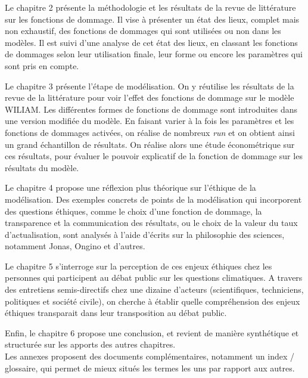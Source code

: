 Le chapitre 2 présente la méthodologie et les résultats de la revue de littérature sur les fonctions de dommage. Il vise à présenter un état des lieux, complet mais non exhaustif, des fonctions de dommages qui sont utilisées ou non dans les modèles. Il est suivi d'une analyse de cet état des lieux, en classant les fonctions de dommages selon leur utilisation finale, leur forme ou encore les paramètres qui sont pris en compte. 

Le chapitre 3 présente l'étape de modélisation. On y réutilise les résultats de la revue de la littérature pour voir l'effet des fonctions de dommage sur le modèle WILIAM. Les différentes formes de fonctions de dommage sont introduites dans une version modifiée du modèle. En faisant varier à la fois les paramètres et les fonctions de dommages activées, on réalise de nombreux \textit{run} et on obtient ainsi un grand échantillon de résultats. On réalise alors une étude économétrique sur ces résultats, pour évaluer le pouvoir explicatif de la fonction de dommage sur les résultats du modèle. 

Le chapitre 4 propose une réflexion plus théorique sur l'éthique de la modélisation. Des exemples concrets de points de la modélisation qui incorporent des questions éthiques, comme le choix d'une fonction de dommage, la transparence et la communication des résultats, ou le choix de la valeur du taux d'actualisation, sont analysés à l'aide d'écrits sur la philosophie des sciences, notamment Jonas, Ongino et d'autres. 

Le chapitre 5 s'interroge sur la perception de ces enjeux éthiques chez les personnes qui participent au débat public sur les questions climatiques. A travers des entretiens semis-directifs chez une dizaine d'acteurs (scientifiques, techniciens, politiques et société civile), on cherche à établir quelle compréhension des enjeux éthiques transparait dans leur transposition au débat public. 

Enfin, le chapitre 6 propose une conclusion, et revient de manière synthétique et structurée sur les apports des autres chapitres. \\

Les annexes proposent des documents complémentaires, notamment un index / glossaire, qui permet de mieux situés les termes les uns par rapport aux autres. 

